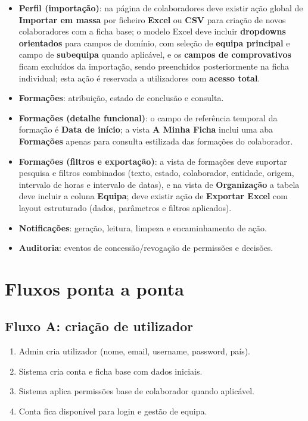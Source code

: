 \documentclass[11pt,a4paper]{article}
\begin{document}
\begin{itemize}
  \item \textbf{Perfil (importação)}: na página de colaboradores deve existir ação global de \textbf{Importar em massa} por ficheiro \textbf{Excel} ou \textbf{CSV} para criação de novos colaboradores com a ficha base; o modelo Excel deve incluir \textbf{dropdowns orientados} para campos de domínio, com seleção de \textbf{equipa principal} e campo de \textbf{subequipa} quando aplicável, e os \textbf{campos de comprovativos} ficam excluídos da importação, sendo preenchidos posteriormente na ficha individual; esta ação é reservada a utilizadores com \textbf{acesso total}.
  \item \textbf{Formações}: atribuição, estado de conclusão e consulta.
  \item \textbf{Formações (detalhe funcional)}: o campo de referência temporal da formação é \textbf{Data de início}; a vista \textbf{A Minha Ficha} inclui uma aba \textbf{Formações} apenas para consulta estilizada das formações do colaborador.
  \item \textbf{Formações (filtros e exportação)}: a vista de formações deve suportar pesquisa e filtros combinados (texto, estado, colaborador, entidade, origem, intervalo de horas e intervalo de datas), e na vista de \textbf{Organização} a tabela deve incluir a coluna \textbf{Equipa}; deve existir ação de \textbf{Exportar Excel} com layout estruturado (dados, parâmetros e filtros aplicados).
  \item \textbf{Notificações}: geração, leitura, limpeza e encaminhamento de ação.
  \item \textbf{Auditoria}: eventos de concessão/revogação de permissões e decisões.
\end{itemize}

\section{Fluxos ponta a ponta}
\subsection{Fluxo A: criação de utilizador}
\begin{enumerate}
  \item Admin cria utilizador (nome, email, username, password, país).
  \item Sistema cria conta e ficha base com dados iniciais.
  \item Sistema aplica permissões base de colaborador quando aplicável.
  \item Conta fica disponível para login e gestão de equipa.
\end{enumerate}
\end{document}
